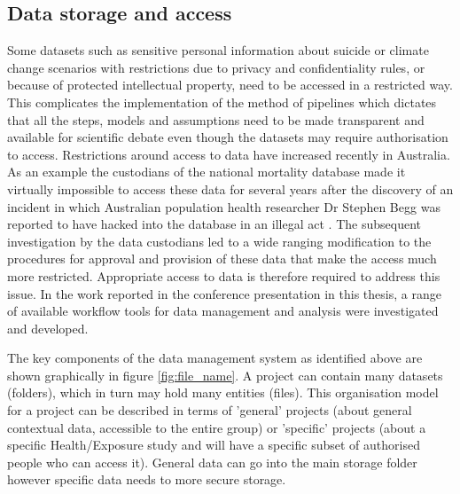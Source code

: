 \documentclass[11pt,a4paper]{article}
\begin{document}
\subsection{Data storage and access}\label{data-storage-and-access}

Some datasets such as sensitive personal information about suicide or
climate change scenarios with restrictions due to privacy and
confidentiality rules, or because of protected intellectual property,
need to be accessed in a restricted way. This complicates the
implementation of the method of pipelines which dictates that all the
steps, models and assumptions need to be made transparent and available
for scientific debate even though the datasets may require authorisation
to access. Restrictions around access to data have increased recently in
Australia. As an example the custodians of the national mortality
database made it virtually impossible to access these data for several
years after the discovery of an incident in which Australian population
health researcher Dr Stephen Begg was reported to have hacked into the
database in an illegal act \citep{OKeefe2007}. The subsequent investigation
by the data custodians led to a wide ranging modification to the
procedures for approval and provision of these data that make the access
much more restricted. Appropriate access to data is therefore required
to address this issue. In the work reported in the conference
presentation in this thesis, a range of available workflow tools for
data management and analysis were investigated and developed.

The key components of the  data management system as identified above are shown graphically in figure 
\ref{fig:file_name}.  A project can contain many datasets (folders), which in turn may hold many entities (files). This organisation model for a project can be described in terms of 'general' projects (about general contextual data, accessible to the entire group) or 'specific' projects (about a specific Health/Exposure study and will have a specific subset of authorised people who can access it).  General data can go into the main storage folder however specific data needs to more secure storage.
\end{document}
